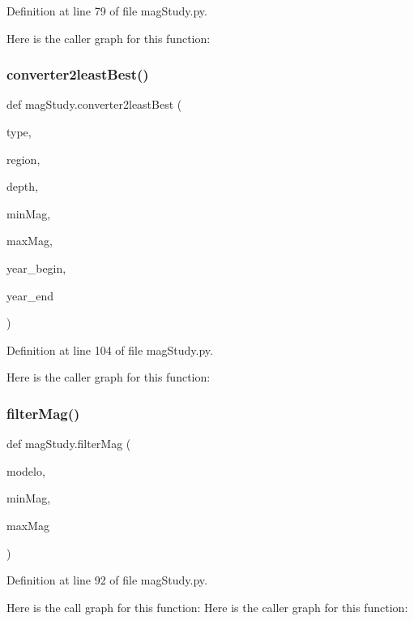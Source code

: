 Definition at line 79 of file mag\+Study.\+py.

Here is the caller graph for this function\+:
\mbox{\label{namespacemag_study_ab2fae2886f74b1b3c92b479d5c5b1b13}} 
\subsubsection{\texorpdfstring{converter2least\+Best()}{converter2leastBest()}}
{\footnotesize\ttfamily def mag\+Study.\+converter2least\+Best (\begin{DoxyParamCaption}\item[{}]{type,  }\item[{}]{region,  }\item[{}]{depth,  }\item[{}]{min\+Mag,  }\item[{}]{max\+Mag,  }\item[{}]{year\+\_\+begin,  }\item[{}]{year\+\_\+end }\end{DoxyParamCaption})}



Definition at line 104 of file mag\+Study.\+py.

Here is the caller graph for this function\+:
\mbox{\label{namespacemag_study_a00128b94305d32ba4cf222a137eb59a1}} 
\subsubsection{\texorpdfstring{filter\+Mag()}{filterMag()}}
{\footnotesize\ttfamily def mag\+Study.\+filter\+Mag (\begin{DoxyParamCaption}\item[{}]{modelo,  }\item[{}]{min\+Mag,  }\item[{}]{max\+Mag }\end{DoxyParamCaption})}



Definition at line 92 of file mag\+Study.\+py.

Here is the call graph for this function\+:
Here is the caller graph for this function\+:
\mbox{\label{namespacemag_study_a649e8ae23cf682792eb73ca96460ef26}} 
